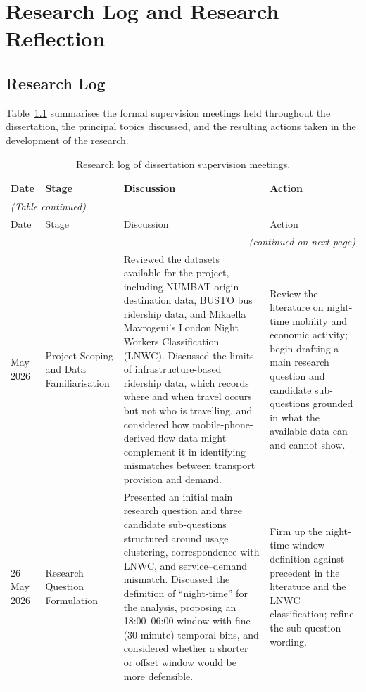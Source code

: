 \chapter{Research Log and Research Reflection}
\label{appendixlabel2}

\section{Research Log}

Table~\ref{tab:appB1} summarises the formal supervision meetings held throughout the dissertation, the principal topics discussed, and the resulting actions taken in the development of the research.

\small
\begin{landscape}
\begingroup
\small
\setlength{\tabcolsep}{5pt}
\renewcommand{\arraystretch}{1.12}
\begin{longtable}{@{}p{2.4cm} p{4.0cm} p{8.0cm} p{6.6cm}@{}}
\caption[Research log]{Research log of dissertation supervision meetings.} \label{tab:appB1} \\
\toprule
Date & Stage & Discussion & Action \\
\midrule
\endfirsthead
\multicolumn{4}{l}{\small\itshape (Table continued)} \\
\toprule
Date & Stage & Discussion & Action \\
\midrule
\endhead
\bottomrule
\multicolumn{4}{r}{\small\itshape (continued on next page)} \\
\endfoot
\bottomrule
\endlastfoot
12 May 2026 & Project Scoping and Data Familiarisation & Reviewed the datasets available for the project, including NUMBAT origin--destination data, BUSTO bus ridership data, and Mikaella Mavrogeni's London Night Workers Classification (LNWC). Discussed the limits of infrastructure-based ridership data, which records where and when travel occurs but not who is travelling, and considered how mobile-phone-derived flow data might complement it in identifying mismatches between transport provision and demand. & Review the literature on night-time mobility and economic activity; begin drafting a main research question and candidate sub-questions grounded in what the available data can and cannot show. \\
26 May 2026 & Research Question Formulation & Presented an initial main research question and three candidate sub-questions structured around usage clustering, correspondence with LNWC, and service--demand mismatch. Discussed the definition of ``night-time'' for the analysis, proposing an 18:00--06:00 window with fine (30-minute) temporal bins, and considered whether a shorter or offset window would be more defensible. & Firm up the night-time window definition against precedent in the literature and the LNWC classification; refine the sub-question wording. \\

\end{longtable}
\end{landscape}
